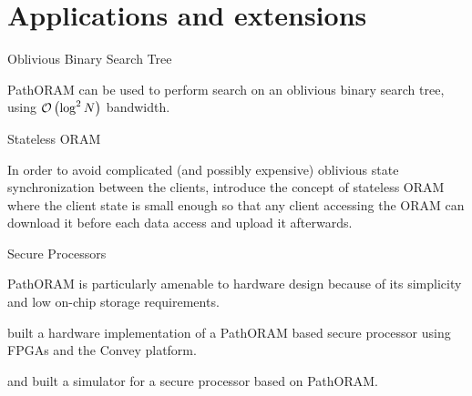 
\section{Applications and extensions}

	\begin{frame}{Oblivious Binary Search Tree}
		
		PathORAM can be used to perform search on an oblivious binary search tree, using $\mathcal{O}\left(\log^2 N\right)$ bandwidth.~\cite{Gentry:2013}

	\end{frame}

	\begin{frame}{Stateless ORAM}
		
		In order to avoid complicated (and possibly expensive) oblivious state synchronization between the clients, \citeauthor{DBLP:journals/corr/abs-1105-4125} introduce the concept of stateless ORAM~\cite{DBLP:journals/corr/abs-1105-4125} where the client state is small enough so that any client accessing the ORAM can download it before each data access and upload it afterwards.

	\end{frame}

	\begin{frame}{Secure Processors}
		
		PathORAM is particularly amenable to hardware design because of its simplicity and low on-chip storage requirements.

		\textcite{Maas:EECS-2014-89} built a hardware implementation of a PathORAM based secure processor using FPGAs and the Convey platform. %

		\textcite{Fletcher:2012:SPA:2382536.2382540, fletcher2013ascend} and \textcite{ren2013design} built a simulator for a secure processor based on PathORAM\@.

	\end{frame}

